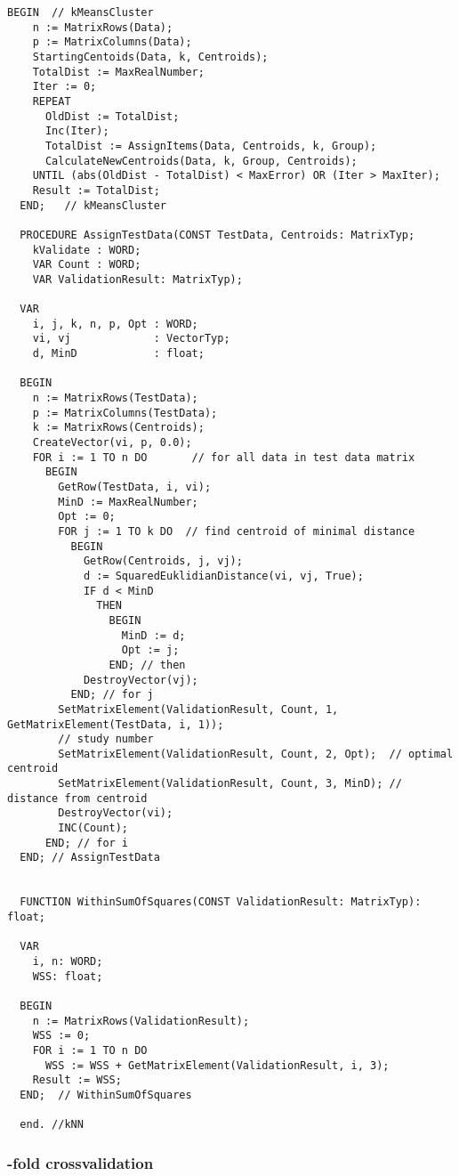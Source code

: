 \begin{refsection}
\begin{lstlisting}[caption=unit kNN: \skalar{k}-means clustering]
  BEGIN  // kMeansCluster
    n := MatrixRows(Data);
    p := MatrixColumns(Data);
    StartingCentoids(Data, k, Centroids);
    TotalDist := MaxRealNumber;
    Iter := 0;
    REPEAT
      OldDist := TotalDist;
      Inc(Iter);
      TotalDist := AssignItems(Data, Centroids, k, Group);
      CalculateNewCentroids(Data, k, Group, Centroids);
    UNTIL (abs(OldDist - TotalDist) < MaxError) OR (Iter > MaxIter);
    Result := TotalDist;
  END;   // kMeansCluster

  PROCEDURE AssignTestData(CONST TestData, Centroids: MatrixTyp;
    kValidate : WORD;
    VAR Count : WORD;
    VAR ValidationResult: MatrixTyp);

  VAR
    i, j, k, n, p, Opt : WORD;
    vi, vj             : VectorTyp;
    d, MinD            : float;

  BEGIN
    n := MatrixRows(TestData);
    p := MatrixColumns(TestData);
    k := MatrixRows(Centroids);
    CreateVector(vi, p, 0.0);
    FOR i := 1 TO n DO       // for all data in test data matrix
      BEGIN
        GetRow(TestData, i, vi);
        MinD := MaxRealNumber;
        Opt := 0;
        FOR j := 1 TO k DO  // find centroid of minimal distance
          BEGIN
            GetRow(Centroids, j, vj);
            d := SquaredEuklidianDistance(vi, vj, True);
            IF d < MinD
              THEN
                BEGIN
                  MinD := d;
                  Opt := j;
                END; // then
            DestroyVector(vj);
          END; // for j
        SetMatrixElement(ValidationResult, Count, 1, GetMatrixElement(TestData, i, 1));
        // study number
        SetMatrixElement(ValidationResult, Count, 2, Opt);  // optimal centroid
        SetMatrixElement(ValidationResult, Count, 3, MinD); // distance from centroid
        DestroyVector(vi);
        INC(Count);
      END; // for i
  END; // AssignTestData


  FUNCTION WithinSumOfSquares(CONST ValidationResult: MatrixTyp): float;

  VAR
    i, n: WORD;
    WSS: float;

  BEGIN
    n := MatrixRows(ValidationResult);
    WSS := 0;
    FOR i := 1 TO n DO
      WSS := WSS + GetMatrixElement(ValidationResult, i, 3);
    Result := WSS;
  END;  // WithinSumOfSquares

  end. //kNN
\end{lstlisting}

\subsubsection{-fold crossvalidation}


\end{refsection}

